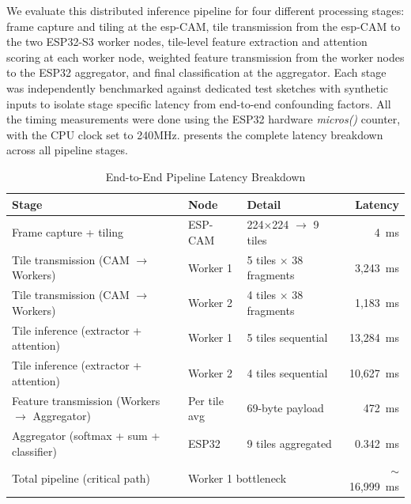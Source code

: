 We evaluate this distributed inference pipeline for four different processing stages: frame capture and tiling at the \gls{esp}-CAM, tile transmission from the \gls{esp}-CAM to the two ESP32-S3 worker nodes, tile-level feature extraction and attention scoring at each worker node, weighted feature transmission from the worker nodes to the ESP32 aggregator, and final classification at the aggregator. Each stage was independently benchmarked against dedicated test sketches with synthetic inputs to isolate stage specific latency from end-to-end confounding factors. All the timing measurements were done using the ESP32 hardware \textit{micros()} counter, with the CPU clock set to 240MHz.  presents the complete latency breakdown across
all pipeline stages.
 
\begin{table}[H]
\renewcommand{\arraystretch}{1.25}
\caption{End-to-End Pipeline Latency Breakdown}
\label{tab:pipeline_latency}
\centering
\small
\begin{tabular}{p{4.5cm}p{2.5cm}p{3cm}r}
\toprule
\textbf{Stage} & \textbf{Node} & \textbf{Detail} & \textbf{Latency} \\
\midrule
Frame capture + tiling
    & ESP-CAM        & 224$\times$224 $\rightarrow$ 9 tiles  & 4~ms            \\
Tile transmission (CAM $\rightarrow$ Workers)
    & Worker 1       & 5 tiles $\times$ 38 fragments         & 3,243~ms        \\
Tile transmission (CAM $\rightarrow$ Workers)
    & Worker 2       & 4 tiles $\times$ 38 fragments         & 1,183~ms        \\
Tile inference (extractor + attention)
    & Worker 1       & 5 tiles sequential                    & 13,284~ms       \\
Tile inference (extractor + attention)
    & Worker 2       & 4 tiles sequential                    & 10,627~ms       \\
Feature transmission (Workers $\rightarrow$ Aggregator)
    & Per tile avg   & 69-byte payload                       & 472~ms          \\
Aggregator (softmax + sum + classifier)
    & ESP32          & 9 tiles aggregated                    & 0.342~ms        \\
\midrule
Total pipeline (critical path)
    & \multicolumn{2}{l}{Worker 1 bottleneck}               & $\sim$16,999~ms \\
\bottomrule
\end{tabular}
\end{table}
 
